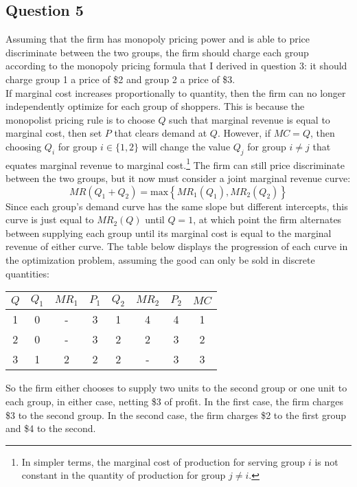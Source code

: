 \documentclass{article}
\begin{document}
\pagebreak
\subsection*{Question 5}
Assuming that the firm has monopoly pricing power and is able to price discriminate between the two groups, the firm should charge each group according to the monopoly pricing formula that I derived in question 3: it should charge group 1 a price of \$2 and group 2 a price of \$3.
\medskip \\
If marginal cost increases proportionally to quantity, then the firm can no longer independently optimize for each group of shoppers. This is because the monopolist pricing rule is to choose $Q$ such that marginal revenue is equal to marginal cost, then set $P$ that clears demand at $Q$. However, if $MC=Q$, then choosing $Q_i$ for group ${i\in\{1,2\}}$ will change the value $Q_j$ for group ${i\neq j}$ that equates marginal revenue to marginal cost.\footnote{In simpler terms, the marginal cost of production for serving group $i$ is not constant in the quantity of production for group ${j\neq i}$.} The firm can still price discriminate between the two groups, but it now must consider a joint marginal revenue curve:
\[
	MR(Q_1 + Q_2) = \text{max}\left\{MR_1(Q_1),MR_2(Q_2)\right\}
\]
Since each group's demand curve has the same slope but different intercepts, this curve is just equal to $MR_2(Q)$ until ${Q=1}$, at which point the firm alternates between supplying each group until its marginal cost is equal to the marginal revenue of either curve. The table below displays the progression of each curve in the optimization problem, assuming the good can only be sold in discrete quantities:
\begin{center}
	\begin{tabular}{c|ccc|ccc|c}
		$Q$ & $Q_1$ & $MR_1$ 	& $P_1$	& $Q_2$ & $MR_2$	& $P_2$	& $MC$	\\\hline
		1	& 0		& -			& 3		& 1		& 4		 	& 4		& 1		\\
		2 	& 0		& -			& 3		& 2		& 2		 	& 3		& 2		\\
		3	& 1		& 2			& 2		& 2		& -			& 3		& 3
	\end{tabular}
\end{center}
So the firm either chooses to supply two units to the second group or one unit to each group, in either case, netting \$3 of profit. In the first case, the firm charges \$3 to the second group. In the second case, the firm charges \$2 to the first group and \$4 to the second.


\end{document}
